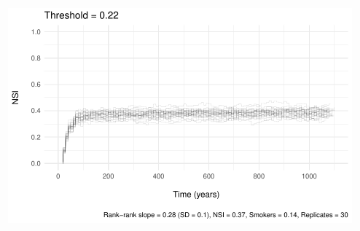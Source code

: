 \begin{figure}[htp]
     \begin{subfigure}[b]{0.50\textwidth}
         \centering
         \includegraphics[width=\textwidth]{plots/verification/segregation/nsi_2.pdf}
     \end{subfigure} %

\end{figure}
